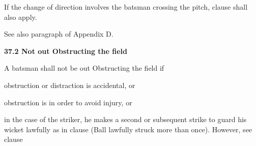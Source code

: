 \documentclass[12pt]{article}
\begin{document}
\vspace{\baselineskip}
\begin{adjustwidth}{0.5in}{0.0in}
{\fontsize{9pt}{10.8pt}\selectfont If the change of direction involves the batsman crossing the pitch, clause shall also apply.\par}\par

\end{adjustwidth}


\vspace{\baselineskip}
\begin{adjustwidth}{0.5in}{0.0in}
{\fontsize{9pt}{10.8pt}\selectfont See also paragraph of Appendix D.\par}\par

\end{adjustwidth}


\vspace{\baselineskip}
{\fontsize{11pt}{13.2pt}\selectfont \textbf{37.2 \tabto{0.47in} Not out Obstructing the field}\par}\par


\vspace{\baselineskip}
{\fontsize{9pt}{10.8pt}\selectfont A batsman shall not be out Obstructing the field if\par}\par


\vspace{\baselineskip}
{\fontsize{9pt}{10.8pt}\selectfont obstruction or distraction is accidental, or\par}\par


\vspace{\baselineskip}
{\fontsize{9pt}{10.8pt}\selectfont obstruction is in order to avoid injury, or\par}\par


\vspace{\baselineskip}
\begin{adjustwidth}{0.0in}{0.08in}
{\fontsize{9pt}{10.8pt}\selectfont in the case of the striker, he makes a second or subsequent strike to guard his wicket lawfully as in clause (Ball lawfully struck more than once). However, see clause \par}\par

\end{adjustwidth}
\end{document}

